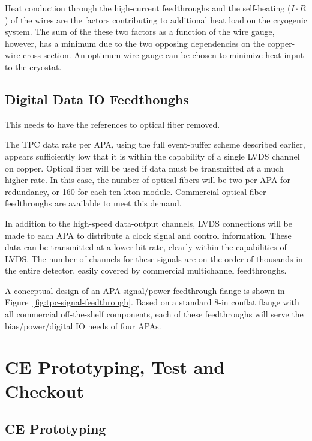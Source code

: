 Heat conduction through the high-current feedthroughs and the self-heating ($I\cdot R$) of the wires are the factors
contributing to additional heat load on the cryogenic system.
The sum of the these two factors as a function of the wire gauge, however, has a minimum 
due to the two opposing dependencies on the copper-wire cross section.
An optimum wire gauge can be chosen to minimize heat input to the cryostat.

\subsection{Digital Data IO Feedthoughs}
\label{subsec:ce-feedthru-digital}

\begin{editornote}
  This needs to have the references to optical fiber removed.
\end{editornote}

The TPC data rate per APA, using the
full event-buffer scheme described earlier,
appears sufficiently low that it is within the capability of a single LVDS channel on copper.
Optical fiber will be used if data must be transmitted at a much higher rate.
In this case, the number of optical fibers will be two per APA for redundancy, or 160 for each ten-kton module.
Commercial optical-fiber feedthroughs are available to meet this demand.

In addition to the high-speed data-output channels,  LVDS connections will be made to each APA to 
distribute a clock signal and control information.
These data can be transmitted at a lower bit rate, clearly within the
capabilities of LVDS.
The number of channels for these signals 
are on the order of thousands in the entire detector, easily covered by commercial multichannel feedthroughs. 

A conceptual design of an APA signal/power feedthrough flange is shown in Figure~\ref{fig:tpc-signal-feedthrough}.
Based on a standard 8-in conflat flange with all commercial off-the-shelf components,
each of these feedthroughs will serve the bias/power/digital IO needs of four APAs.  

\section{CE Prototyping, Test and  Checkout}
\label{sec:ce-checkout}

\subsection{CE Prototyping}
\label{sec:ce-checkout-prototype}

